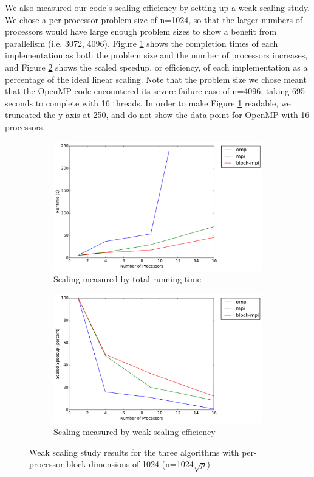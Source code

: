 \documentclass[11pt]{article}
\begin{document}
We also measured our code's scaling efficiency by setting up a weak scaling study.
We chose a per-processor problem size of n=1024, so that the larger numbers of processors would have large enough problem sizes to show a benefit from parallelism (i.e. 3072, 4096).
Figure \ref{fig:weak-scaling-time} shows the completion times of each implementation as both the problem size and the number of processors increases, and Figure \ref{fig:weak-scaling-percent} shows the scaled speedup, or efficiency, of each implementation as a percentage of the ideal linear scaling. 
Note that the problem size we chose meant that the OpenMP code encountered its severe failure case of n=4096, taking 695 seconds to complete with 16 threads.
In order to make Figure \ref{fig:weak-scaling-time} readable, we truncated the y-axis at 250, and do not show the data point for OpenMP with 16 processors.

\begin{figure}[ht]
	\centering
	\begin{subfigure}[b]{.45\textwidth}
		\includegraphics[width=\textwidth]{weak-scaling-time.pdf}
		\caption{Scaling measured by total running time}
		\label{fig:weak-scaling-time}
	\end{subfigure}
	\begin{subfigure}[b]{.45\textwidth}
		\includegraphics[width=\textwidth]{weak-scaling-percent.pdf}
		\caption{Scaling measured by weak scaling efficiency}
		\label{fig:weak-scaling-percent}
	\end{subfigure}
	\caption{Weak scaling study results for the three algorithms with per-processor block dimensions of 1024 (n=1024$\sqrt{p}$)}
	\label{fig:weak-scaling}
\end{figure}
\end{document}
